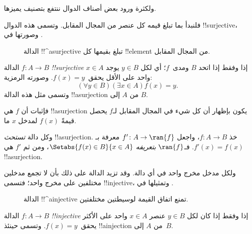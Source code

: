 \documentclass[../../../include/open-logic-section]{subfiles}
\begin{document}

\begin{explain}
ولكثرة ورود بعض أصناف الدوال ننتفع بتصنيف يميزها.

فلنبدأ بما تبلغ قيمه كل عنصر من المجال المقابل. وتسمى هذه الدوال !!{surjective}، وصورتها في .

\begin{figure}
  \caption{الدالة !!^a{surjective} تبلغ بقيمها كل !!{element} من المجال المقابل.}
\end{figure}
\end{explain}

\begin{defn}
الدالة $f \colon A \rightarrow B$ \emph{!!{surjective}} إذا وفقط إذا
اتحد $B$ ومدى~$f$؛ أي لكل $y \in B$ يوجد $x \in A$ واحد على الأقل
يحقق~$f(x) = y$. وصورته الرمزية:
\[
  (\forall y \in B)(\exists x \in A)f(x) = y.
\]
وتسمى مثل هذه الدالة !!a{surjection} من $A$ إلى $B$.
\end{defn}

\begin{explain}
فإثبات أن $f$ هي !!a{surjection} يكون بإظهار أن كل شيء في المجال
المقابل لـ$f$ يحصل قيمةً $f(x)$ لمدخل $x$ ما.

وكل دالة \emph{تستحث} !!a{surjection}. خذ $f \colon A \to B$،
واجعل $f' \colon A \to \ran{f}$ معرفة بـ$f'(x) = f(x)$.
فـ$\ran{f}$ \emph{بتعريفه} $\Setabs{f(x) \in B}{x \in A}$،
ومن ثم $f'$ هي !!a{surjection}.
\end{explain}

\begin{explain}
ولكل مدخل مخرج واحد في أي دالة. وقد تزيد الدالة على ذلك بأن
لا تجمع مدخلين مختلفين على مخرج واحد؛ فتسمى !!{injective}،
وتمثيلها في .
\begin{figure}
  \caption{الدالة !!^a{injective} تمنع اتفاق القيمة لوسيطتين مختلفتين.}
\end{figure}
\end{explain}

\begin{defn}
الدالة $f \colon A \rightarrow B$ \emph{!!{injective}} إذا وفقط إذا
كان لكل $y \in B$ عنصر $x \in A$ واحد على الأكثر يحقق~$f(x) = y$.
وتسمى حينئذ !!a{injection} من $A$ إلى~$B$.
\end{defn}
\end{document}
